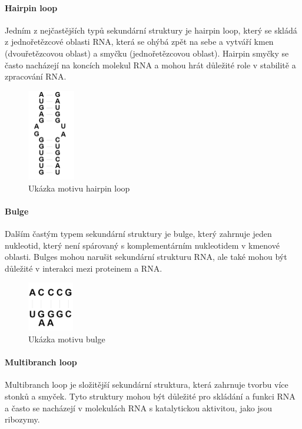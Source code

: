 \paragraph{Hairpin loop}

Jedním z nejčastějších typů sekundární struktury je hairpin loop, který se
skládá z jednořetězcové oblasti RNA, která se ohýbá zpět na sebe a vytváří kmen
(dvouřetězcovou oblast) a smyčku (jednořetězcovou oblast). Hairpin smyčky se
často nacházejí na koncích molekul RNA a mohou hrát důležité role v stabilitě a
zpracování RNA.

\begin{figure}[H]
  \centering
  \includegraphics[height=40mm]{../img/kap01/rna/hairpin.png}
  \caption{Ukázka motivu hairpin loop}
\end{figure}

\paragraph{Bulge}

Dalším častým typem sekundární struktury je bulge, který zahrnuje jeden
nukleotid, který není spárovaný s komplementárním nukleotidem v kmenové
oblasti. Bulges mohou narušit sekundární strukturu RNA, ale také mohou být
důležité v interakci mezi proteinem a RNA.

\begin{figure}[H]
  \centering
  \includegraphics[width=20mm]{../img/kap01/rna/bulge.png}
  \caption{Ukázka motivu bulge}
\end{figure}

\paragraph{Multibranch loop}

Multibranch loop je složitější sekundární struktura, která zahrnuje tvorbu více
stonků a smyček. Tyto struktury mohou být důležité pro skládání a funkci RNA a
často se nacházejí v molekulách RNA s katalytickou aktivitou, jako jsou
ribozymy.

